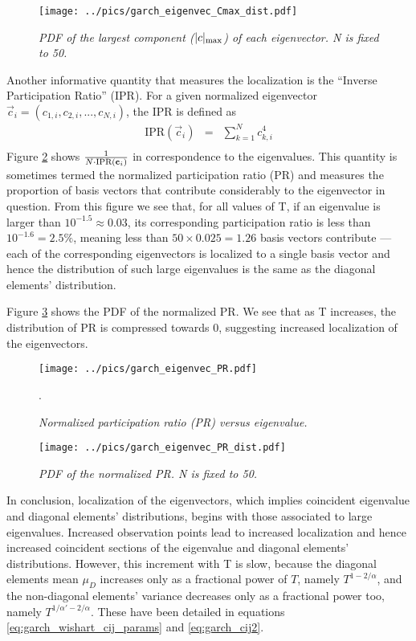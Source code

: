\documentclass{report}
\begin{document}
\begin{figure}[htb!]
  \centering
  \texttt{[image: ../pics/garch\_eigenvec\_Cmax\_dist.pdf]}
  \caption{\small \it PDF of the largest component ($|c|_\M$) of
    each eigenvector. N is fixed to 50.}
  \label{fig:garch_eigenvec_Cmax_dist}
\end{figure}

Another informative quantity that measures the localization is the
``Inverse Participation Ratio'' (IPR). For a given normalized eigenvector
$\vec{c}_i = (c_{1, i}, c_{2, i}, ..., c_{N, i})$, the IPR is defined
as \cite{Aberg2013}
\begin{eqnarray*}
  \text{IPR}(\vec{c}_i) &=& \sum_{k=1}^N c_{k,i}^4 \\
\end{eqnarray*}
Figure \ref{fig:garch_eigenvec_PR} shows ${1 \over
  N \cdot \text{IPR}(\vec{c}_i)}$ in correspondence to the
eigenvalues. This quantity is sometimes termed the
normalized participation ratio (PR) and measures the proportion of
basis vectors that contribute considerably to the eigenvector in
question. From this figure we see that, for all values of T, if an
eigenvalue is larger than $10^{-1.5} \approx 0.03$, its corresponding
participation ratio is less than $10^{-1.6} = 2.5\%$, meaning less
than $50 \times 0.025 = 1.26$ basis vectors contribute --- each of the
corresponding eigenvectors is localized to a single basis vector and
hence the distribution of such large eigenvalues is the same as the
diagonal elements' distribution.

Figure \ref{fig:garch_eigenvec_PR_dist} shows the PDF of the
normalized PR. We see that as T increases, the distribution of PR is
compressed towards 0, suggesting increased localization of the
eigenvectors.
\begin{figure}[htb!]
  \centering
  \texttt{[image: ../pics/garch\_eigenvec\_PR.pdf]}
  \caption{\small \it Normalized participation ratio (PR)
    versus eigenvalue.}.
  \label{fig:garch_eigenvec_PR}
\end{figure}

\begin{figure}[htb!]
  \centering
  \texttt{[image: ../pics/garch\_eigenvec\_PR\_dist.pdf]}
  \caption{\small \it PDF of the normalized PR. N is fixed to
    50.}
  \label{fig:garch_eigenvec_PR_dist}
\end{figure}
In conclusion, localization of the eigenvectors, which implies 
coincident eigenvalue and diagonal elements' distributions, begins with
those associated to large eigenvalues. Increased observation points
lead to increased localization and hence increased coincident sections
of the eigenvalue and diagonal elements' distributions. However, this
increment with T is slow, because the diagonal elements mean $\mu_D$
increases only as a fractional power of $T$, namely $T^{1 -
  2/\alpha}$, and the non-diagonal elements' variance decreases only
as a fractional power too, namely $T^{1/\alpha' - 2/\alpha}$. These
have been detailed in equations \ref{eq:garch_wishart_cij_params} and
\ref{eq:garch_cij2}.
\end{document}
